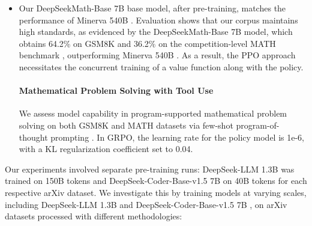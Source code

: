 \begin{itemize}[topsep=0pt]
\begin{itemize}[topsep=0pt]
\begin{itemize}[topsep=0pt]
\begin{itemize}
\begin{equation}
\footnotesize
\begin{split}
    \mathcal{J}_{GRPO}(\theta) &= \mathbb{E}{[q \sim P(Q), \{o_i\}_{i=1}^G \sim \pi_{\theta_{old}}(O|q)]}  \\
    & \frac{1}{G}\sum_{i=1}^G\frac{1}{|o_i|} \sum_{t=1}^{|o_i|} \left\{ \min \left[ \frac{\pi_\theta(o_{i,t} | q, o_{i,<t})}{\pi_{\theta_{old}}(o_{i,t} | q, o_{i,<t})} \hat{A}_{i,t}, \text{clip} \left( \frac{\pi_\theta(o_{i,t} | q, o_{i,<t})}{\pi_{\theta_{old}}(o_{i,t} | q, o_{i,<t})}, 1 - \varepsilon, 1 + \varepsilon \right)  \hat{A}_{i,t} \right] - \beta \mathbb{D}_{KL}\left[\pi_{\theta} || \pi_{ref}\right]\right\} ,
\end{split}
\label{eq:GRPO-obj}
\end{equation}

In this context, $\varepsilon$ and $\beta$ are still hyper-parameters, and $\hat{A}_{i,t}$ is a group-wise advantage, which is derived using only the relative rewards within the group; we elaborate on this computation in later subsections. \item Our DeepSeekMath-Base 7B base model, after pre-training, matches the performance of Minerva 540B \citep{minerva}. Evaluation shows that our corpus maintains high standards, as evidenced by the DeepSeekMath-Base 7B model, which obtains 64.2\% on GSM8K \citep{gsm8k} and 36.2\% on the competition-level MATH benchmark \citep{MATH}, outperforming Minerva 540B \citep{minerva}. As a result, the PPO approach necessitates the concurrent training of a value function along with the policy. \paragraph{Mathematical Problem Solving with Tool Use} We assess model capability in program-supported mathematical problem solving on both GSM8K and MATH datasets via few-shot program-of-thought prompting \citep{pot,pal}. In GRPO, the learning rate for the policy model is 1e-6, with a KL regularization coefficient set to 0.04. \end{itemize}

Our experiments involved separate pre-training runs: DeepSeek-LLM 1.3B was trained on 150B tokens and DeepSeek-Coder-Base-v1.5 7B on 40B tokens for each respective arXiv dataset. We investigate this by training models at varying scales, including DeepSeek-LLM 1.3B and DeepSeek-Coder-Base-v1.5 7B \citep{deepseek-coder}, on arXiv datasets processed with different methodologies:


\end{itemize}
\end{itemize}
\end{itemize}
